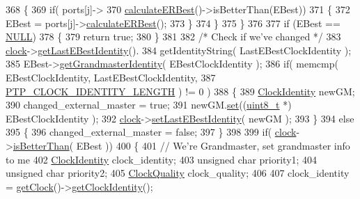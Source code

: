 \begin{DoxyCode}
368         \{
369             \textcolor{keywordflow}{if}( ports[j]->
370                 \hyperlink{class_common_port_a6951410ed8e6a5ef44a028ef0a50cdeb}{calculateERBest}()->isBetterThan(EBest))
371             \{
372                 EBest = ports[j]->\hyperlink{class_common_port_a6951410ed8e6a5ef44a028ef0a50cdeb}{calculateERBest}();
373             \}
374         \}
375     \}
376 
377     \textcolor{keywordflow}{if} (EBest == \hyperlink{openavb__types__base__pub_8h_a070d2ce7b6bb7e5c05602aa8c308d0c4}{NULL})
378     \{
379         \textcolor{keywordflow}{return} \textcolor{keyword}{true};
380     \}
381 
382     \textcolor{comment}{/* Check if we've changed */}
383     \hyperlink{class_common_port_aa2bc8731fa5aeb5b033feebc2b67258c}{clock}->\hyperlink{class_i_e_e_e1588_clock_ac49f35801b6e22547682034e47b02c90}{getLastEBestIdentity}().
384         getIdentityString( LastEBestClockIdentity );
385     EBest->\hyperlink{class_p_t_p_message_announce_a8c30dedc349082deec06da1c0691f500}{getGrandmasterIdentity}( EBestClockIdentity );
386     \textcolor{keywordflow}{if}( memcmp( EBestClockIdentity, LastEBestClockIdentity,
387             \hyperlink{ptptypes_8hpp_afd1566058ed7927c2b790c9d4a0051ec}{PTP\_CLOCK\_IDENTITY\_LENGTH} ) != 0 )
388     \{
389         \hyperlink{class_clock_identity}{ClockIdentity} newGM;
390         changed\_external\_master = \textcolor{keyword}{true};
391         newGM.\hyperlink{class_clock_identity_ab72d8e8d5a8c02e4c3a3ddcb272e7f4c}{set}((\hyperlink{stdint_8h_aba7bc1797add20fe3efdf37ced1182c5}{uint8\_t} *) EBestClockIdentity );
392         \hyperlink{class_common_port_aa2bc8731fa5aeb5b033feebc2b67258c}{clock}->\hyperlink{class_i_e_e_e1588_clock_a92b9d40586b473e0538333eb446f05f9}{setLastEBestIdentity}( newGM );
393     \}
394     \textcolor{keywordflow}{else}
395     \{
396         changed\_external\_master = \textcolor{keyword}{false};
397     \}
398 
399     \textcolor{keywordflow}{if}( \hyperlink{class_common_port_aa2bc8731fa5aeb5b033feebc2b67258c}{clock}->\hyperlink{class_i_e_e_e1588_clock_a3bf4e41c1ccf46f20b2330330bd69630}{isBetterThan}( EBest ))
400     \{
401         \textcolor{comment}{// We're Grandmaster, set grandmaster info to me}
402         \hyperlink{class_clock_identity}{ClockIdentity} clock\_identity;
403         \textcolor{keywordtype}{unsigned} \textcolor{keywordtype}{char} priority1;
404         \textcolor{keywordtype}{unsigned} \textcolor{keywordtype}{char} priority2;
405         \hyperlink{struct_clock_quality}{ClockQuality} clock\_quality;
406 
407         clock\_identity = \hyperlink{class_common_port_ab8e59ecfb51ec14e166bc8bfc872b1ef}{getClock}()->\hyperlink{class_i_e_e_e1588_clock_a56fd598a1dfd3bfe0658272544921162}{getClockIdentity}();

\end{DoxyCode}

